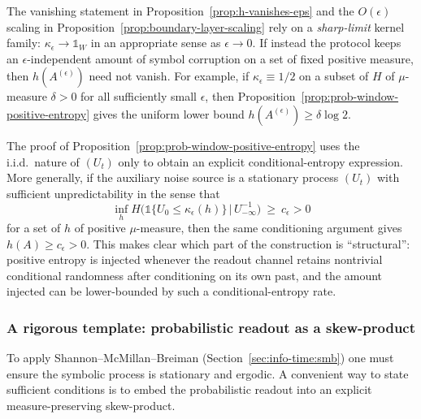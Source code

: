 \begin{remark}\label{rem:counterexample-eps}
The vanishing statement in Proposition~\ref{prop:h-vanishes-eps} and the $O(\epsilon)$ scaling in Proposition~\ref{prop:boundary-layer-scaling} rely on a \emph{sharp-limit} kernel family: $\kappa_\epsilon\to \mathds{1}_W$ in an appropriate sense as $\epsilon\to 0$.
If instead the protocol keeps an $\epsilon$-independent amount of symbol corruption on a set of fixed positive measure, then $h(A^{(\epsilon)})$ need not vanish.
For example, if $\kappa_\epsilon\equiv 1/2$ on a subset of $H$ of $\mu$-measure $\delta>0$ for all sufficiently small $\epsilon$, then Proposition~\ref{prop:prob-window-positive-entropy} gives the uniform lower bound $h(A^{(\epsilon)})\ge \delta\log 2$.
\end{remark}

\begin{remark}\label{rem:entropy-robust-correlated}
The proof of Proposition~\ref{prop:prob-window-positive-entropy} uses the i.i.d.\ nature of $(U_t)$ only to obtain an explicit conditional-entropy expression. More generally, if the auxiliary noise source is a stationary process $(U_t)$ with sufficient unpredictability in the sense that
\[
\inf_h H\bigl(\mathds{1}\{U_0\le \kappa_\epsilon(h)\}\,\big|\,U_{-\infty}^{-1}\bigr)\ \ge\ c_\epsilon>0
\]
for a set of $h$ of positive $\mu$-measure, then the same conditioning argument gives $h(A)\ge c_\epsilon>0$. This makes clear which part of the construction is ``structural'': positive entropy is injected whenever the readout channel retains nontrivial conditional randomness after conditioning on its own past, and the amount injected can be lower-bounded by such a conditional-entropy rate.
\end{remark}

\subsubsection{A rigorous template: probabilistic readout as a skew-product}\label{sec:readout:probabilistic-template}

To apply Shannon--McMillan--Breiman (Section~\ref{sec:info-time:smb}) one must ensure the symbolic process is stationary and ergodic. A convenient way to state sufficient conditions is to embed the probabilistic readout into an explicit measure-preserving skew-product.

